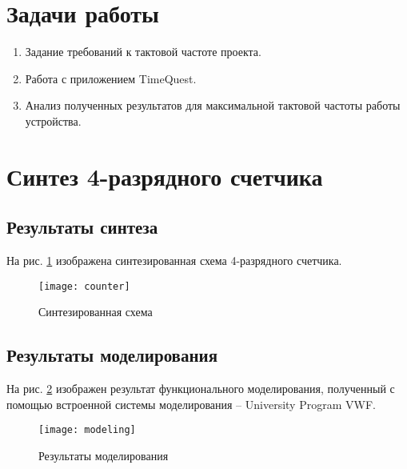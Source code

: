 





\tableofcontents
\listoffigures
\lstlistoflistings
\newpage

\section{Задачи работы}

\begin{enumerate}
\setlength\itemsep{0em}
\item Задание требований к тактовой частоте проекта.
\item Работа с приложением TimeQuest.
\item Анализ полученных результатов для максимальной тактовой частоты работы устройства.
\end{enumerate}

\section{Синтез 4-разрядного счетчика}

\subsection{Результаты синтеза}

На рис. \ref{fig:counter} изображена синтезированная схема 4-разрядного счетчика.

\begin{figure}[H]
\begin{center}
	\texttt{[image: counter]}
	\caption{Синтезированная схема}
	\label{fig:counter}
\end{center}
\end{figure}

\vspace{-0.5cm}
\subsection{Результаты моделирования}

На рис. \ref{fig:func-modeling} изображен результат функционального моделирования, полученный с помощью встроенной системы моделирования – University Program VWF.

\vspace{-0.5cm}
\begin{figure}[H]
\begin{center}
	\texttt{[image: modeling]}
	\caption{Результаты моделирования}
	\label{fig:func-modeling}
\end{center}
\end{figure}

